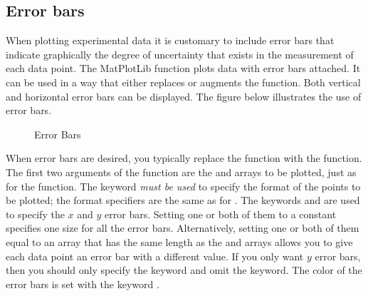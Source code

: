 \documentclass[letterpaper,10pt,english]{sphinxmanual}
\begin{document}
\subsection{Error bars}
\label{chap5/chap5_plot:error-bars}
When plotting experimental data it is customary to include error bars that indicate graphically the degree of uncertainty that exists in the measurement of each data point.  The MatPlotLib function  plots data with error bars attached.  It can be used in a way that either replaces or augments the  function.  Both vertical and horizontal error bars can be displayed.  The figure below illustrates the use of error bars.
\begin{figure}[htbp]
\centering
\capstart

\caption{Error Bars}\label{chap5/chap5_plot:fig-expdecay}\end{figure}

When error bars are desired, you typically replace the  function with the  function.  The first two arguments of the   function are the  and  arrays to be plotted, just as for the  function.  The keyword  \emph{must be used} to specify the format of the points to be plotted; the format specifiers are the same as for .  The keywords  and  are used to specify the \(x\) and \(y\) error bars.  Setting one or both of them to a constant specifies one size for all the error bars.  Alternatively, setting one or both of them equal to an array that has the same length as the  and  arrays allows you to give each data point an error bar with a different value.  If you only want \(y\) error bars, then you should only specify the  keyword and omit the  keyword.  The color of the error bars is set with the keyword .
\end{document}
